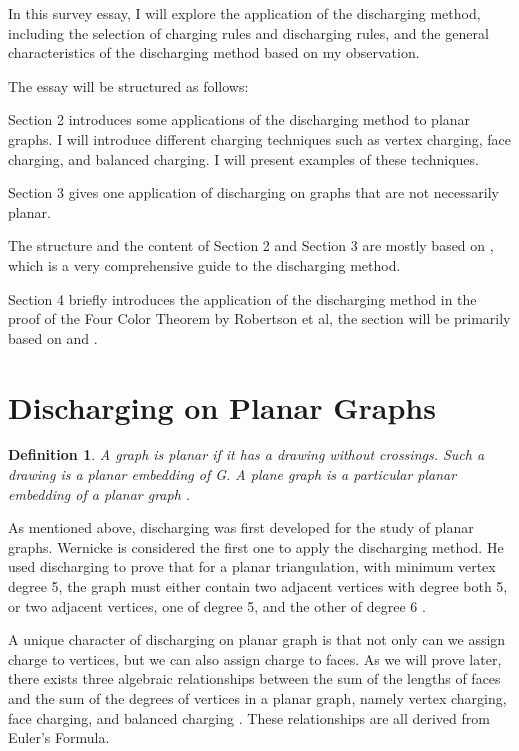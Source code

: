 \documentclass[a4paper, 11pt]{article} %
\newtheorem*{definition}{Definition}
\begin{document}
In this survey essay, I will explore the application of the discharging method, including the selection of charging rules and discharging rules, and the general characteristics of the discharging method based on my observation. 

The essay will be structured as follows:

Section 2 introduces some applications of the discharging method to planar graphs. I will introduce different charging techniques such as vertex charging, face charging, and balanced charging. I will present examples of these techniques.


Section 3 gives one application of discharging on graphs that are not necessarily planar.

The structure and the content of Section 2 and Section 3 are mostly based on \cite{cranston2013guide}, which is a very comprehensive guide to the discharging method.

Section 4 briefly introduces the application of the discharging method in the proof of the Four Color Theorem by Robertson et al, the section will be primarily based on \cite{thomas1998update} and \cite{robertson1997four}.
 
 

\section{Discharging on Planar Graphs}

\begin{definition}
A graph is planar if it has a drawing without crossings. Such a drawing is a planar embedding of G. A plane graph is a particular planar embedding of a planar graph \cite{west_introduction_2000}.
\end{definition}

As mentioned above, discharging was first developed for the study of planar graphs. Wernicke is considered the first one to apply the discharging method. He used discharging to prove that for a planar triangulation, with minimum vertex degree 5, the graph must either contain two adjacent vertices with degree both 5, or two adjacent vertices, one of degree 5, and the other of degree 6 \cite{wernicke1904kartographischen}.

A unique character of discharging on planar graph is that not only can we assign charge to vertices, but we can also assign charge to faces. As we will prove later, there exists three algebraic relationships between the sum of the lengths of faces and the sum of the degrees of vertices in a planar graph, namely vertex charging, face charging, and balanced charging \cite{cranston2013guide}. These relationships are all derived from Euler's Formula.
\end{document}
